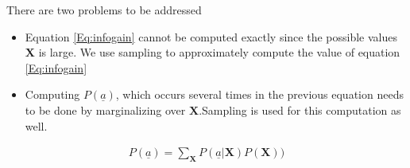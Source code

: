 \documentclass[10pt,twocolumn,letterpaper]{article}
\begin{document}
There are two problems to be addressed
\begin{itemize}

\item Equation {\ref{Eq:infogain} cannot be computed exactly since the possible values $\textbf{X}$ is large. We use sampling to approximately compute the value of equation \ref{Eq:infogain}}

\item{Computing $P( \underline{a})$, which occurs several times in the previous equation needs to be done by marginalizing over $\textbf{X}$.Sampling is used for this computation as well.} 
\end{itemize}

\begin{align}
 P(\underline{a}) = \sum_{\textbf{X}}P( \underline{a}|\textbf{X})P(\textbf{X}))
\end{align}
\end{document}
